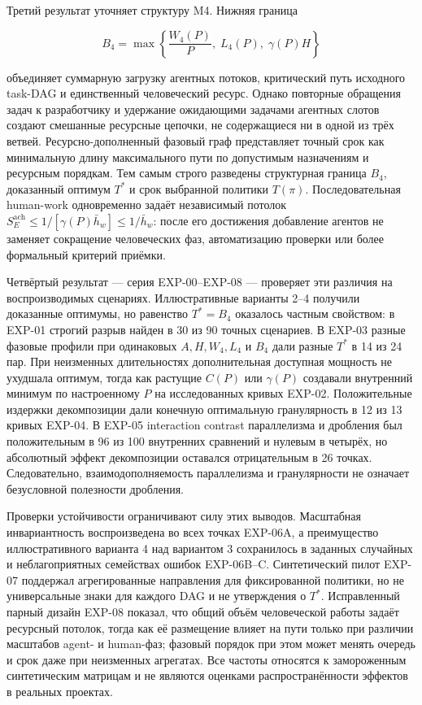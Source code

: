 Третий результат уточняет структуру M4. Нижняя граница

\[
  B_4=\max\left\{\frac{W_4(P)}{P},\;L_4(P),\;\gamma(P)H\right\}
\]

объединяет суммарную загрузку агентных потоков, критический путь исходного
task-DAG и единственный человеческий ресурс. Однако повторные обращения задач
к разработчику и удержание ожидающими задачами агентных слотов создают
смешанные ресурсные цепочки, не содержащиеся ни в одной из трёх ветвей.
Ресурсно-дополненный фазовый граф представляет точный срок как минимальную
длину максимального пути по допустимым назначениям и ресурсным порядкам. Тем
самым строго разведены структурная граница $B_4$, доказанный оптимум $T^*$ и
срок выбранной политики $T(\pi)$. Последовательная human-work одновременно
задаёт независимый потолок
$S_E^{\mathrm{ach}}\le1/[\gamma(P)\bar h_w]\le1/\bar h_w$: после его
достижения добавление агентов не заменяет сокращение человеческих фаз,
автоматизацию проверки или более формальный критерий приёмки.

Четвёртый результат --- серия EXP-00--EXP-08 --- проверяет эти различия на
воспроизводимых сценариях. Иллюстративные варианты 2--4 получили доказанные
оптимумы, но равенство $T^*=B_4$ оказалось частным свойством: в EXP-01 строгий
разрыв найден в 30 из 90 точных сценариев. В EXP-03 разные фазовые профили при
одинаковых $A,H,W_4,L_4$ и $B_4$ дали разные $T^*$ в 14 из 24 пар. При
неизменных длительностях дополнительная доступная мощность не ухудшала оптимум,
тогда как растущие $C(P)$ или $\gamma(P)$ создавали внутренний минимум по
настроенному $P$ на исследованных кривых EXP-02. Положительные издержки
декомпозиции дали конечную оптимальную гранулярность в 12 из 13 кривых EXP-04.
В EXP-05 interaction contrast параллелизма и дробления был положительным в 96
из 100 внутренних сравнений и нулевым в четырёх, но абсолютный эффект
декомпозиции оставался отрицательным в 26 точках. Следовательно,
взаимодополняемость параллелизма и гранулярности не означает безусловной
полезности дробления.

Проверки устойчивости ограничивают силу этих выводов. Масштабная
инвариантность воспроизведена во всех точках EXP-06A, а преимущество
иллюстративного варианта 4 над вариантом 3 сохранилось в заданных случайных и
неблагоприятных семействах ошибок EXP-06B--C. Синтетический пилот EXP-07
поддержал агрегированные направления для фиксированной политики, но не
универсальные знаки для каждого DAG и не утверждения о $T^*$. Исправленный
парный дизайн EXP-08 показал, что общий объём человеческой работы задаёт
ресурсный потолок, тогда как её размещение влияет на пути только при различии
масштабов agent- и human-фаз; фазовый порядок при этом может менять очередь и
срок даже при неизменных агрегатах. Все частоты относятся к замороженным
синтетическим матрицам и не являются оценками распространённости эффектов в
реальных проектах.

